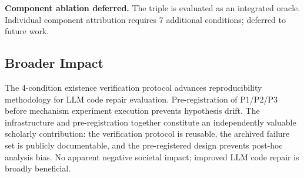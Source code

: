 \textbf{Component ablation deferred.} The triple is evaluated as an integrated oracle.
Individual component attribution requires 7 additional conditions; deferred to
future work.

\subsection{Broader Impact}

The 4-condition existence verification protocol advances reproducibility methodology
for LLM code repair evaluation. Pre-registration of P1/P2/P3 before mechanism
experiment execution prevents hypothesis drift. The infrastructure and pre-registration
together constitute an independently valuable scholarly contribution: the verification
protocol is reusable, the archived failure set is publicly documentable, and the
pre-registered design prevents post-hoc analysis bias. No apparent negative societal
impact; improved LLM code repair is broadly beneficial.

